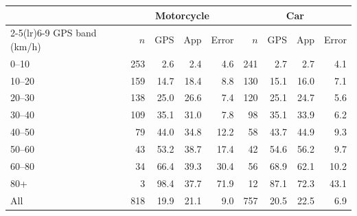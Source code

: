 \begin{tabular}{l rrrr rrrr}
\toprule
 & \multicolumn{4}{c}{Motorcycle} & \multicolumn{4}{c}{Car}\\
\cmidrule(lr){2-5}\cmidrule(lr){6-9}
GPS band (km/h) & $n$ & GPS & App & Error & $n$ & GPS & App & Error\\
\midrule
0--10 & 253 & 2.6 & 2.4 & 4.6 & 241 & 2.7 & 2.7 & 4.1 \\
10--20 & 159 & 14.7 & 18.4 & 8.8 & 130 & 15.1 & 16.0 & 7.1 \\
20--30 & 138 & 25.0 & 26.6 & 7.4 & 120 & 25.1 & 24.7 & 5.6 \\
30--40 & 109 & 35.1 & 31.0 & 7.8 & 98 & 35.1 & 33.9 & 6.2 \\
40--50 & 79 & 44.0 & 34.8 & 12.2 & 58 & 43.7 & 44.9 & 9.3 \\
50--60 & 43 & 53.2 & 38.7 & 17.4 & 42 & 54.6 & 56.2 & 9.7 \\
60--80 & 34 & 66.4 & 39.3 & 30.4 & 56 & 68.9 & 62.1 & 10.2 \\
80+ & 3 & 98.4 & 37.7 & 71.9 & 12 & 87.1 & 72.3 & 43.1 \\
\midrule
All & 818 & 19.9 & 21.1 & 9.0 & 757 & 20.5 & 22.5 & 6.9 \\
\bottomrule
\end{tabular}
